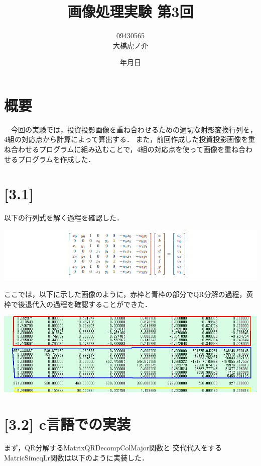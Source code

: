 \documentclass[11pt]{jarticle}
\begin{document}
\title{画像処理実験 第3回}
\author{09430565\\大橋虎ノ介}
\date{\number\year 年\number\month 月\number\day 日}
\maketitle

\section{概要}

　今回の実験では，投資投影画像を重ね合わせるための適切な射影変換行列を，4組の対応点から計算によって算出する．
また，前回作成した投資投影画像を重ね合わせるプログラムに組み込むことで，4組の対応点を使って画像を重ね合わせるプログラムを作成した．

\section{[3.1]}

以下の行列式を解く過程を確認した．

\includegraphics[scale=.6]{./img/fig1.png}

ここでは，以下に示した画像のように，赤枠と青枠の部分でQR分解の過程，黄枠で後退代入の過程を確認することができた．

\includegraphics[scale=.5]{./img/fig2.png}

\section{[3.2] c言語での実装}

まず，QR分解するMatrixQRDecompColMajor関数と
交代代入をするMatricSimeqLr関数は以下のように実装した．
\end{document}
